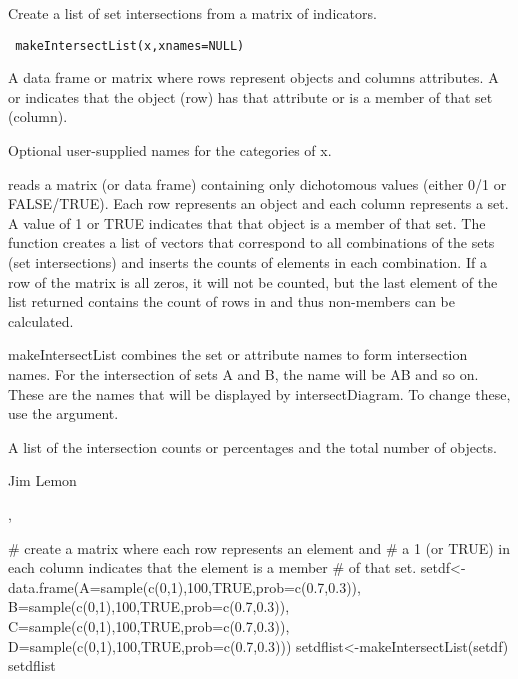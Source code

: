 \begin{Description}\relax
Create a list of set intersections from a matrix of indicators.
\end{Description}
\begin{Usage}
\begin{verbatim}
 makeIntersectList(x,xnames=NULL)
\end{verbatim}
\end{Usage}
\begin{Arguments}
\begin{ldescription}
\item[\code{x}] A data frame or matrix where rows represent objects and columns
attributes. A  or  indicates that the object (row) has
that attribute or is a member of that set (column).
\item[\code{xnames}] Optional user-supplied names for the categories of x.
\end{ldescription}
\end{Arguments}
\begin{Details}\relax
{} reads a matrix (or data frame) containing only
dichotomous values (either 0/1 or FALSE/TRUE). Each row represents an object
and each column represents a set. A value of 1 or TRUE indicates that that
object is a member of that set. The function creates a list of vectors that
correspond to all combinations of the sets (set intersections) and inserts the
counts of elements in each combination. If a row of the matrix is all zeros,
it will not be counted, but the last element of the list returned contains the
count of rows in  and thus non-members can be calculated.

makeIntersectList combines the set or attribute names to form
intersection names. For the intersection of sets A and B, the name will
be AB and so on. These are the names that will be displayed by
intersectDiagram. To change these, use the  argument.
\end{Details}
\begin{Value}
A list of the intersection counts or percentages and the total number of
objects.
\end{Value}
\begin{Author}\relax
Jim Lemon
\end{Author}
\begin{SeeAlso}\relax
{}, 
\end{SeeAlso}
\begin{Examples}
\begin{ExampleCode}
 # create a matrix where each row represents an element and
 # a 1 (or TRUE) in each column indicates that the element is a member
 # of that set.
 setdf<-data.frame(A=sample(c(0,1),100,TRUE,prob=c(0.7,0.3)),
  B=sample(c(0,1),100,TRUE,prob=c(0.7,0.3)),
  C=sample(c(0,1),100,TRUE,prob=c(0.7,0.3)),
  D=sample(c(0,1),100,TRUE,prob=c(0.7,0.3)))
 setdflist<-makeIntersectList(setdf)
 setdflist
\end{ExampleCode}
\end{Examples}

